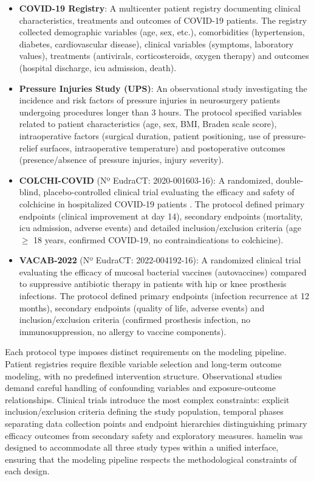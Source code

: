 \documentclass[conference,twocolumn]{IEEEtran}
\begin{document}
\begin{itemize}
    \item \textbf{COVID-19 Registry}: A multicenter patient registry documenting clinical characteristics, treatments and outcomes of COVID-19 patients. The registry collected demographic variables (age, sex, etc.), comorbidities (hypertension, diabetes, cardiovascular disease), clinical variables (symptoms, laboratory values), treatments (antivirals, corticosteroids, oxygen therapy) and outcomes (hospital discharge, \gls{icu} admission, death).
    
    \item \textbf{Pressure Injuries Study (UPS)}: An observational study investigating the incidence and risk factors of pressure injuries in neurosurgery patients undergoing procedures longer than 3 hours. The protocol specified variables related to patient characteristics (age, sex, BMI, Braden scale score), intraoperative factors (surgical duration, patient positioning, use of pressure-relief surfaces, intraoperative temperature) and postoperative outcomes (presence/absence of pressure injuries, injury severity).
    
    \item \textbf{COLCHI-COVID} (Nº EudraCT: 2020-001603-16): A randomized, double-blind, placebo-controlled clinical trial evaluating the efficacy and safety of colchicine in hospitalized COVID-19 patients \cite{estebanez2021effectiveness}. The protocol defined primary endpoints (clinical improvement at day 14), secondary endpoints (mortality, \gls{icu} admission, adverse events) and detailed inclusion/exclusion criteria (age $\geq$ 18 years, confirmed COVID-19, no contraindications to colchicine).
    
    \item \textbf{VACAB-2022} (Nº EudraCT: 2022-004192-16): A randomized clinical trial evaluating the efficacy of mucosal bacterial vaccines (autovaccines) compared to suppressive antibiotic therapy in patients with hip or knee prosthesis infections. The protocol defined primary endpoints (infection recurrence at 12 months), secondary endpoints (quality of life, adverse events) and inclusion/exclusion criteria (confirmed prosthesis infection, no immunosuppression, no allergy to vaccine components).
\end{itemize}

Each protocol type imposes distinct requirements on the modeling pipeline. Patient registries require flexible variable selection and long-term outcome modeling, with no predefined intervention structure. Observational studies demand careful handling of confounding variables and exposure-outcome relationships. Clinical trials introduce the most complex constraints: explicit inclusion/exclusion criteria defining the study population, temporal phases separating data collection points and endpoint hierarchies distinguishing primary efficacy outcomes from secondary safety and exploratory measures. \gls{hamelin} was designed to accommodate all three study types within a unified interface, ensuring that the modeling pipeline respects the methodological constraints of each design.
\end{document}
